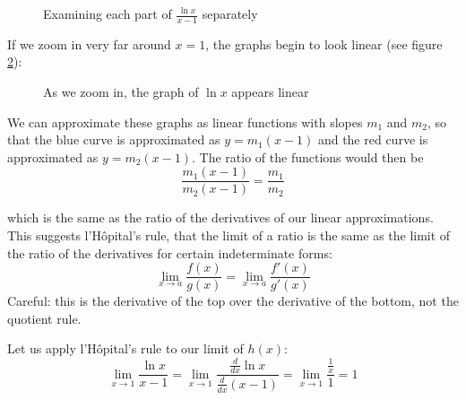 \begin{figure}[H]
\centering
{}
\caption{Examining each part of $\frac{\ln{x}}{x-1}$ separately}
\label{fig:zoom1}
\end{figure}

If we zoom in very far around $x=1$, the graphs begin to look linear (see 
figure \ref{fig:zoom2}):

\begin{figure}[H]
\centering
{}
\caption{As we zoom in, the graph of $\ln{x}$ appears linear}
\label{fig:zoom2}
\end{figure}

We can approximate these graphs as linear functions with slopes $m_1$ and 
$m_2$, so that the blue curve is approximated as $y=m_1(x-1)$ and the red 
curve is approximated as $y=m_2(x-1)$. The ratio of the functions would then 
be 
$$\frac{m_1(x-1)}{m_2(x-1)}=\frac{m_1}{m_2}$$ 

which is the same as the ratio of the derivatives of our linear approximations. 
This suggests l'H\^{o}pital's rule, that the limit of a ratio is the same as the 
limit of the ratio of the derivatives for certain indeterminate forms: 
$$\lim_{x\to a}\frac{f(x)}{g(x)}=\lim_{x\to a}\frac{f'(x)}{g'(x)}$$
Careful: this is the derivative of the top over the derivative of the
bottom, not the quotient rule.

Let us apply l'H\^{o}pital's rule to our limit of $h(x)$:
$$\lim_{x\to 1} \frac{\ln{x}}{x - 1} = \lim_{x \to 1} \frac{\frac{d}{dx} 
\ln{x}}{\frac{d}{dx} (x - 1)} = \lim_{x \to 1} \frac{\frac{1}{x}}{1}=1$$

